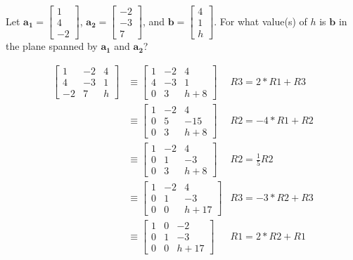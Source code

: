 \documentclass{../mathhomework}
\newcommand{\Vect}[1]{\pmb{#1}}
\begin{document}
\begin{problem}[1.3\#17]
    Let $\Vect{a_1} = \begin{bmatrix}1 \\ 4 \\ -2\end{bmatrix}$, 
    $\Vect{a_2} = \begin{bmatrix}-2 \\ -3 \\ 7\end{bmatrix}$, and
    $\Vect{b} = \begin{bmatrix}4 \\ 1 \\ h\end{bmatrix}$. For what value(s) of $h$ is $\Vect{b}$ in the plane spanned by $\Vect{a_1}$ and $\Vect{a_2}$?

    \begin{solution}
        \begin{align*}
            \begin{bmatrix}
                1 & -2 & 4 \\
                4 & -3 & 1 \\
                -2 & 7 & h
            \end{bmatrix}
            & \equiv
            \begin{bmatrix}
                1 & -2 & 4 \\
                4 & -3 & 1 \\
                0 & 3 & h + 8
            \end{bmatrix}
            & R3 = 2 * R1 + R3 \\ & \equiv
            \begin{bmatrix}
                1 & -2 & 4 \\
                0 & 5 & -15 \\
                0 & 3 & h + 8
            \end{bmatrix}
            & R2 = -4 * R1 + R2 \\ & \equiv
            \begin{bmatrix}
                1 & -2 & 4 \\
                0 & 1 & -3 \\
                0 & 3 & h + 8
            \end{bmatrix}
            & R2 = \frac{1}{5} R2 \\ & \equiv
            \begin{bmatrix}
                1 & -2 & 4 \\
                0 & 1 & -3 \\
                0 & 0 & h + 17
            \end{bmatrix}
            & R3 = -3 * R2 + R3 \\ & \equiv
            \begin{bmatrix}
                1 & 0 & -2 \\
                0 & 1 & -3 \\
                0 & 0 & h + 17
            \end{bmatrix}
            & R1 = 2 * R2 + R1
        \end{align*}


\end{solution}
\end{problem}
\end{document}
